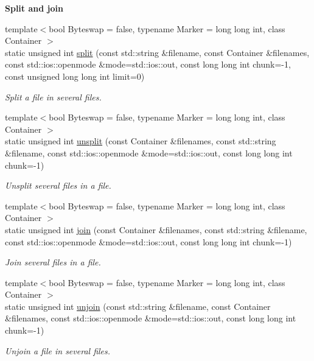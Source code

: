 \begin{Indent}{\bf Split and join}\par
\begin{DoxyCompactItemize}
\item 
{\footnotesize template$<$bool Byteswap = false, typename Marker  = long long int, class Container $>$ }\\static unsigned int \hyperlink{exceptionmagrathea_1_1FileSystem_ab76df44fc991333abf9ff6f003a057f4}{split} (const std\-::string \&filename, const Container \&filenames, const std\-::ios\-::openmode \&mode=std\-::ios\-::out, const long long int chunk=-\/1, const unsigned long long int limit=0)
\begin{DoxyCompactList}\small\item\em Split a file in several files. \end{DoxyCompactList}\item 
{\footnotesize template$<$bool Byteswap = false, typename Marker  = long long int, class Container $>$ }\\static unsigned int \hyperlink{exceptionmagrathea_1_1FileSystem_ac9f237a31be083d0420877f7e50c0f8f}{unsplit} (const Container \&filenames, const std\-::string \&filename, const std\-::ios\-::openmode \&mode=std\-::ios\-::out, const long long int chunk=-\/1)
\begin{DoxyCompactList}\small\item\em Unsplit several files in a file. \end{DoxyCompactList}\item 
{\footnotesize template$<$bool Byteswap = false, typename Marker  = long long int, class Container $>$ }\\static unsigned int \hyperlink{exceptionmagrathea_1_1FileSystem_a546b2a27bbf077ab905c15ba3cfead65}{join} (const Container \&filenames, const std\-::string \&filename, const std\-::ios\-::openmode \&mode=std\-::ios\-::out, const long long int chunk=-\/1)
\begin{DoxyCompactList}\small\item\em Join several files in a file. \end{DoxyCompactList}\item 
{\footnotesize template$<$bool Byteswap = false, typename Marker  = long long int, class Container $>$ }\\static unsigned int \hyperlink{exceptionmagrathea_1_1FileSystem_a37b7681662209ad48ebef52c0f1a2e91}{unjoin} (const std\-::string \&filename, const Container \&filenames, const std\-::ios\-::openmode \&mode=std\-::ios\-::out, const long long int chunk=-\/1)
\begin{DoxyCompactList}\small\item\em Unjoin a file in several files. \end{DoxyCompactList}\end{DoxyCompactItemize}
\end{Indent}
